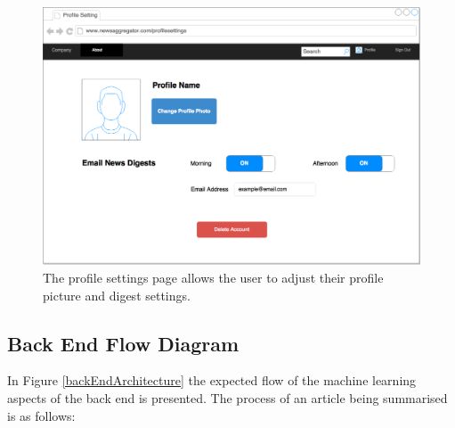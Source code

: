 \documentclass[12pt]{article}
\begin{document}
\begin{figure}[ht!]
  \centering
    \includegraphics[scale=0.3]{ProfileSettings.png}
   \caption[A wireframe of the Profile Settings page]{The profile settings page allows the user to adjust their profile picture and digest settings.}
   \label{profileSettings}
\end{figure}

\subsection{Back End Flow Diagram}

In Figure \ref{backEndArchitecture} the expected flow of the machine learning aspects of the back end is presented. The process of an article being summarised is as follows:
\end{document}
